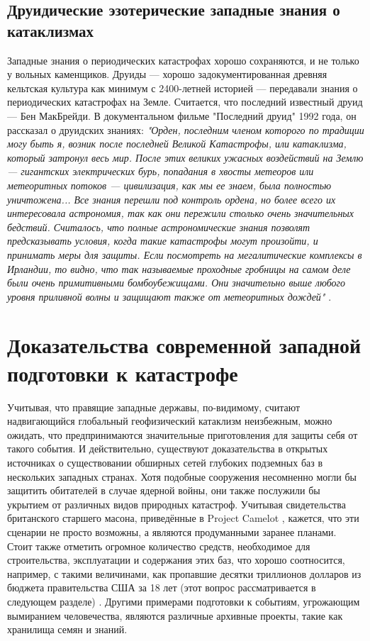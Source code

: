 \documentclass[10pt,twocolumn,letterpaper]{article}
\begin{document}
\subsection{Друидические эзотерические западные знания о катаклизмах}

Западные знания о периодических катастрофах хорошо сохраняются, и не только у вольных каменщиков. Друиды — хорошо задокументированная древняя кельтская культура как минимум с 2400-летней историей \cite{7} — передавали знания о периодических катастрофах на Земле. Считается, что последний известный друид — Бен МакБрейди. В документальном фильме "Последний друид" 1992 года, он рассказал о друидских знаниях: \textit{"Орден, последним членом которого по традиции могу быть я, возник после последней Великой Катастрофы, или катаклизма, который затронул весь мир. После этих великих ужасных воздействий на Землю — гигантских электрических бурь, попадания в хвосты метеоров или метеоритных потоков — цивилизация, как мы ее знаем, была полностью уничтожена... Все знания перешли под контроль ордена, но более всего их интересовала астрономия, так как они пережили столько очень значительных бедствий. Считалось, что полные астрономические знания позволят предсказывать условия, когда такие катастрофы могут произойти, и принимать меры для защиты. Если посмотреть на мегалитические комплексы в Ирландии, то видно, что так называемые проходные гробницы на самом деле были очень примитивными бомбоубежищами. Они значительно выше любого уровня приливной волны и защищают также от метеоритных дождей"} \cite{8,9}.

\section{Доказательства современной западной подготовки к катастрофе}

Учитывая, что правящие западные державы, по-видимому, считают надвигающийся глобальный геофизический катаклизм неизбежным, можно ожидать, что предпринимаются значительные приготовления для защиты себя от такого события. И действительно, существуют доказательства в открытых источниках о существовании обширных сетей глубоких подземных баз в нескольких западных странах. Хотя подобные сооружения несомненно могли бы защитить обитателей в случае ядерной войны, они также послужили бы укрытием от различных видов природных катастроф. Учитывая свидетельства британского старшего масона, приведённые в Project Camelot \cite{4,6}, кажется, что эти сценарии не просто возможны, а являются продуманными заранее планами. Стоит также отметить огромное количество средств, необходимое для строительства, эксплуатации и содержания этих баз, что хорошо соотносится, например, с такими величинами, как пропавшие десятки триллионов долларов из бюджета правительства США за 18 лет (этот вопрос рассматривается в следующем разделе) \cite{11,12,13}. Другими примерами подготовки к событиям, угрожающим вымиранием человечества, являются различные архивные проекты, такие как хранилища семян и знаний.
\end{document}
